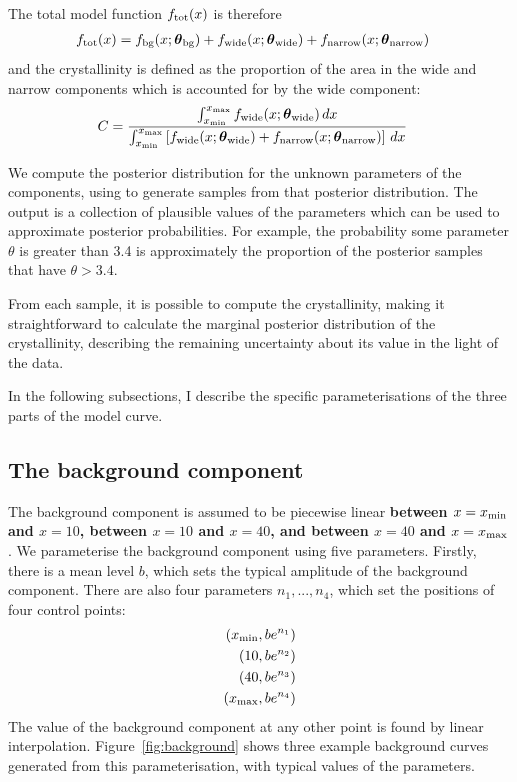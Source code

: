 \documentclass[a4paper, 12pt]{article}
\newcommand{\params}{\boldsymbol{\theta}}
\newcommand{\x}{x}
\newcommand{\todo}{\color{orange} \bf}
\begin{document}
The total model function $f_{\rm tot}(x)$ is therefore
\begin{align}
f_{\rm tot}(\x) &= f_{\rm bg}(\x; \params_{\rm bg})
       + f_{\rm wide}(\x; \params_{\rm wide})
       + f_{\rm narrow}(\x; \params_{\rm narrow})
\end{align}
and the crystallinity is defined as the proportion of the area in the
wide and narrow components which is accounted for by the wide component:
\begin{align}
C &= \frac{\int_{\x_{\rm min}}^{\x_{\rm max}}
            f_{\rm wide}(\x; \params_{\rm wide}) \, d\x}
          {\int_{\x_{\rm min}}^{\x_{\rm max}}
            \left[f_{\rm wide}(\x; \params_{\rm wide})
            + f_{\rm narrow}(\x; \params_{\rm narrow}) \right] \, d\x}
\end{align}

We compute the posterior distribution for the unknown parameters of the
components, using \citep{dnest4} to generate samples from that posterior
distribution. The output is a collection of plausible values of the
parameters which can be used to approximate posterior probabilities.
For example, the probability some parameter $\theta$ is greater than 3.4
is approximately the proportion of the posterior samples that have
$\theta > 3.4$.

From each sample,
it is possible to compute the crystallinity, making it straightforward to
calculate the marginal posterior distribution of the crystallinity, describing
the remaining uncertainty about its value in the light of the data.

In the following subsections, I describe the specific parameterisations of the
three parts of the model curve.

\subsection{The background component}
The background component is assumed to be piecewise linear
{\todo between $\x=\x_{\rm min}$ and $\x=10$, between $\x=10$ and $\x=40$,
and between $\x=40$ and $\x=\x_{\rm max}$}.
We parameterise the background component using
five parameters. Firstly, there is a mean level $b$, which sets the
typical amplitude of the background component. There are also four parameters
$n_1, ..., n_4$, which set the positions of four control points:
\begin{align}
\left(\x_{\rm min}, be^{n_1}\right) \nonumber\\
\left(10, be^{n_2}\right) \nonumber\\
\left(40, be^{n_3}\right) \nonumber\\
\left(\x_{\rm max}, be^{n_4}\right) \nonumber
\end{align}
The value of the background component at any other point is found by
linear interpolation. Figure~\ref{fig:background} shows three example
background curves generated from this parameterisation, with typical
values of the parameters.
\end{document}
